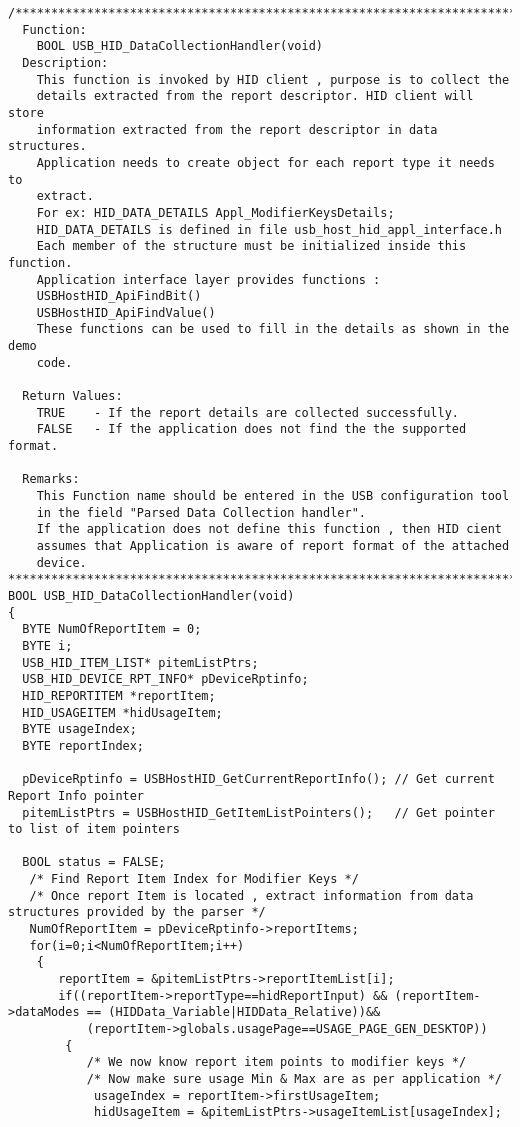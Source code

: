 \documentclass{article}
\begin{document}
\begin{verbatim}
/****************************************************************************
  Function:
    BOOL USB_HID_DataCollectionHandler(void)
  Description:
    This function is invoked by HID client , purpose is to collect the 
    details extracted from the report descriptor. HID client will store
    information extracted from the report descriptor in data structures.
    Application needs to create object for each report type it needs to 
    extract.
    For ex: HID_DATA_DETAILS Appl_ModifierKeysDetails;
    HID_DATA_DETAILS is defined in file usb_host_hid_appl_interface.h
    Each member of the structure must be initialized inside this function.
    Application interface layer provides functions :
    USBHostHID_ApiFindBit()
    USBHostHID_ApiFindValue()
    These functions can be used to fill in the details as shown in the demo
    code.

  Return Values:
    TRUE    - If the report details are collected successfully.
    FALSE   - If the application does not find the the supported format.

  Remarks:
    This Function name should be entered in the USB configuration tool
    in the field "Parsed Data Collection handler".
    If the application does not define this function , then HID cient 
    assumes that Application is aware of report format of the attached
    device.
***************************************************************************/
BOOL USB_HID_DataCollectionHandler(void)
{
  BYTE NumOfReportItem = 0;
  BYTE i;
  USB_HID_ITEM_LIST* pitemListPtrs;
  USB_HID_DEVICE_RPT_INFO* pDeviceRptinfo;
  HID_REPORTITEM *reportItem;
  HID_USAGEITEM *hidUsageItem;
  BYTE usageIndex;
  BYTE reportIndex;

  pDeviceRptinfo = USBHostHID_GetCurrentReportInfo(); // Get current Report Info pointer
  pitemListPtrs = USBHostHID_GetItemListPointers();   // Get pointer to list of item pointers

  BOOL status = FALSE;
   /* Find Report Item Index for Modifier Keys */
   /* Once report Item is located , extract information from data structures provided by the parser */
   NumOfReportItem = pDeviceRptinfo->reportItems;
   for(i=0;i<NumOfReportItem;i++)
    {
       reportItem = &pitemListPtrs->reportItemList[i];
       if((reportItem->reportType==hidReportInput) && (reportItem->dataModes == (HIDData_Variable|HIDData_Relative))&&
           (reportItem->globals.usagePage==USAGE_PAGE_GEN_DESKTOP))
        {
           /* We now know report item points to modifier keys */
           /* Now make sure usage Min & Max are as per application */
            usageIndex = reportItem->firstUsageItem;
            hidUsageItem = &pitemListPtrs->usageItemList[usageIndex];


\end{verbatim}
\end{document}
